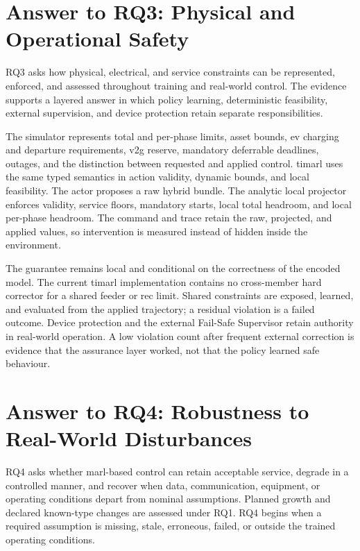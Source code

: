 \section{Answer to RQ3: Physical and Operational Safety}
\label{sec:discussion-rq3}

RQ3 asks how physical, electrical, and service constraints can be represented, enforced, and assessed throughout training and real-world control. The evidence supports a layered answer in which policy learning, deterministic feasibility, external supervision, and device protection retain separate responsibilities.

The simulator represents total and per-phase limits, asset bounds, \gls{ev} charging and departure requirements, \gls{v2g} reserve, mandatory deferrable deadlines, outages, and the distinction between requested and applied control. \gls{timarl} uses the same typed semantics in action validity, dynamic bounds, and local feasibility. The actor proposes a raw hybrid bundle. The analytic local projector enforces validity, service floors, mandatory starts, local total headroom, and local per-phase headroom. The command and trace retain the raw, projected, and applied values, so intervention is measured instead of hidden inside the environment.

The guarantee remains local and conditional on the correctness of the encoded model. The current \gls{timarl} implementation contains no cross-member hard corrector for a shared feeder or \gls{rec} limit. Shared constraints are exposed, learned, and evaluated from the applied trajectory; a residual violation is a failed outcome. Device protection and the external Fail-Safe Supervisor retain authority in real-world operation. A low violation count after frequent external correction is evidence that the assurance layer worked, not that the policy learned safe behaviour.

\section{Answer to RQ4: Robustness to Real-World Disturbances}
\label{sec:discussion-rq4}

RQ4 asks whether \gls{marl}-based control can retain acceptable service, degrade in a controlled manner, and recover when data, communication, equipment, or operating conditions depart from nominal assumptions. Planned growth and declared known-type changes are assessed under RQ1. RQ4 begins when a required assumption is missing, stale, erroneous, failed, or outside the trained operating conditions.

